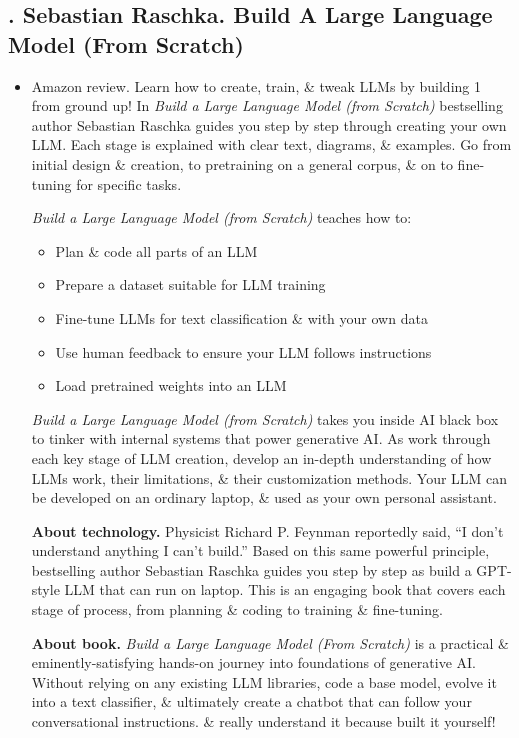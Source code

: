 \documentclass{article}
\begin{document}
\subsection{\cite{Raschka2024}. {\sc Sebastian Raschka}. Build A Large Language Model (From Scratch)}
{}
\begin{itemize}
	\item {\sf Amazon review.} Learn how to create, train, \& tweak LLMs by building 1 from ground up! In {\it Build a Large Language Model (from Scratch)} bestselling author {\sc Sebastian Raschka} guides you step by step through creating your own LLM. Each stage is explained with clear text, diagrams, \& examples. Go from initial design \& creation, to pretraining on a general corpus, \& on to fine-tuning for specific tasks.
	
	{\it Build a Large Language Model (from Scratch)} teaches how to:
	\begin{itemize}
		\item Plan \& code all parts of an LLM
		\item Prepare a dataset suitable for LLM training
		\item Fine-tune LLMs for text classification \& with your own data
		\item Use human feedback to ensure your LLM follows instructions
		\item Load pretrained weights into an LLM
	\end{itemize}
	{\it Build a Large Language Model (from Scratch)} takes you inside AI black box to tinker with internal systems that power generative AI. As work through each key stage of LLM creation, develop an in-depth understanding of how LLMs work, their limitations, \& their customization methods. Your LLM can be developed on an ordinary laptop, \& used as your own personal assistant.
	
	{\bf About technology.} Physicist {\sc Richard P. Feynman} reportedly said, ``I don't understand anything I can't build.'' Based on this same powerful principle, bestselling author {\sc Sebastian Raschka} guides you step by step as build a GPT-style LLM that can run on laptop. This is an engaging book that covers each stage of process, from planning \& coding to training \& fine-tuning.
	
	{\bf About book.} {\it Build a Large Language Model (From Scratch)} is a practical \& eminently-satisfying hands-on journey into foundations of generative AI. Without relying on any existing LLM libraries, code a base model, evolve it into a text classifier, \& ultimately create a chatbot that can follow your conversational instructions. \& really understand it because built it yourself!
	

\end{itemize}
\end{document}
